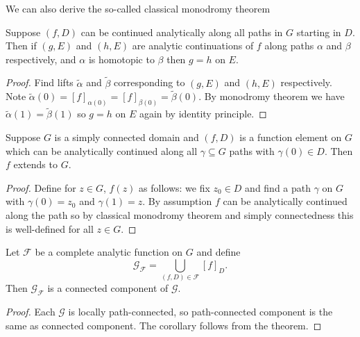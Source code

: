\documentclass[a4paper]{article}
\begin{document}
We can also derive the so-called classical monodromy theorem

\begin{theorem}
  Suppose \((f, D)\) can be continued analytically along all paths in \(G\) starting in \(D\). Then if \((g, E)\) and \((h, E)\) are analytic continuations of \(f\) along paths \(\alpha\) and \(\beta\) respectively, and \(\alpha\) is homotopic to \(\beta\) then \(g = h\) on \(E\).
\end{theorem}

\begin{proof}
  Find lifts \(\tilde \alpha\) and \(\tilde \beta\) corresponding to \((g, E)\) and \((h, E)\) respectively. Note \(\tilde \alpha(0) = [f]_{\alpha(0)} = [f]_{\beta(0)} = \tilde \beta(0)\). By monodromy theorem we have \(\tilde \alpha(1) = \tilde \beta(1)\) so \(g = h\) on \(E\) again by identity principle.
\end{proof}

\begin{corollary}
  Suppose \(G\) is a simply connected domain and \((f, D)\) is a function element on \(G\) which can be analytically continued along all \(\gamma \subseteq G\) paths with \(\gamma(0) \in D\). Then \(f\) extends to \(G\).
\end{corollary}

\begin{proof}
  Define for \(z \in G\), \(f(z)\) as follows: we fix \(z_0 \in D\) and find a path \(\gamma\) on \(G\) with \(\gamma(0) = z_0\) and \(\gamma(1) = z\). By assumption \(f\) can be analytically continued along the path so by classical monodromy theorem and simply connectedness this is well-defined for all \(z \in G\).
\end{proof}





\begin{corollary}
  Let \(\mathcal F\) be a complete analytic function on \(G\) and define
  \[
    \mathcal G_{\mathcal F} = \bigcup_{(f, D) \in \mathcal F} [f]_D.
  \]
  Then \(\mathcal G_{\mathcal F}\) is a connected component of \(\mathcal G\).
\end{corollary}

\begin{proof}
  Each \(\mathcal G\) is locally path-connected, so path-connected component is the same as connected component. The corollary follows from the theorem.
\end{proof}
\end{document}

